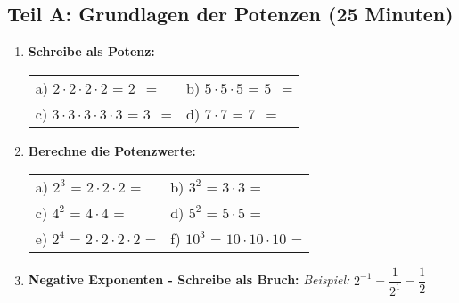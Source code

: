 \subsection*{Teil A: Grundlagen der Potenzen (25 Minuten)}

\begin{enumerate}[label=\arabic*.]

    \item \textbf{Schreibe als Potenz:}
    \vspace{0.5cm}

    \begin{tabular}{ll}
        a) $2 \cdot 2 \cdot 2 \cdot 2$ = $2^{\phantom{0}}$ = \underline{\hspace{3cm}} & b) $5 \cdot 5 \cdot 5$ = $5^{\phantom{0}}$ = \underline{\hspace{3cm}} \\[3ex]
        c) $3 \cdot 3 \cdot 3 \cdot 3 \cdot 3$ = $3^{\phantom{0}}$ = \underline{\hspace{3cm}} & d) $7 \cdot 7$ = $7^{\phantom{0}}$ = \underline{\hspace{3cm}}
    \end{tabular}

    \vspace{1cm}

    \item \textbf{Berechne die Potenzwerte:}
    \vspace{0.5cm}

    \begin{tabular}{ll}
        a) $2^3$ = $2 \cdot 2 \cdot 2$ = \underline{\hspace{3cm}} & b) $3^2$ = $3 \cdot 3$ = \underline{\hspace{3cm}} \\[3ex]
        c) $4^2$ = $4 \cdot 4$ = \underline{\hspace{3cm}} & d) $5^2$ = $5 \cdot 5$ = \underline{\hspace{3cm}} \\[3ex]
        e) $2^4$ = $2 \cdot 2 \cdot 2 \cdot 2$ = \underline{\hspace{3cm}} & f) $10^3$ = $10 \cdot 10 \cdot 10$ = \underline{\hspace{3cm}}
    \end{tabular}

    \vspace{1cm}

    \item \textbf{Negative Exponenten - Schreibe als Bruch:}
    \textit{Beispiel:} $2^{-1} = \dfrac{1}{2^1} = \dfrac{1}{2}$
    \vspace{0.5cm}


\end{enumerate}
